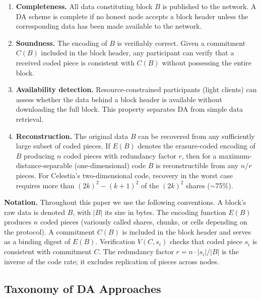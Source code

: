 \begin{enumerate}
    \item \textbf{Completeness.} All data constituting block $B$ is published to the network. A DA scheme is complete if no honest node accepts a block header unless the corresponding data has been made available to the network.

    \item \textbf{Soundness.} The encoding of $B$ is verifiably correct. Given a commitment $C(B)$ included in the block header, any participant can verify that a received coded piece is consistent with $C(B)$ without possessing the entire block.

    \item \textbf{Availability detection.} Resource-constrained participants (light clients) can assess whether the data behind a block header is available without downloading the full block. This property separates DA from simple data retrieval.

    \item \textbf{Reconstruction.} The original data $B$ can be recovered from any sufficiently large subset of coded pieces. If $E(B)$ denotes the erasure-coded encoding of $B$ producing $n$ coded pieces with redundancy factor $r$, then for a maximum-distance-separable (one-dimensional) code $B$ is reconstructible from any $n/r$ pieces. For Celestia's two-dimensional code, recovery in the worst case requires more than $(2k)^2-(k+1)^2$ of the $(2k)^2$ shares ($\sim$75\%).
\end{enumerate}

\noindent\textbf{Notation.}
Throughout this paper we use the following conventions.
A block's raw data is denoted $B$, with $|B|$ its size in bytes.
The encoding function $E(B)$ produces $n$ coded pieces (variously called shares, chunks, or cells depending on the protocol).
A commitment $C(B)$ is included in the block header and serves as a binding digest of $E(B)$.
Verification $V(C, s_i)$ checks that coded piece $s_i$ is consistent with commitment $C$.
The redundancy factor $r = n \cdot |s_i| / |B|$ is the inverse of the code rate; it excludes replication of pieces across nodes.


\subsection{Taxonomy of DA Approaches}
\label{subsec:taxonomy}

